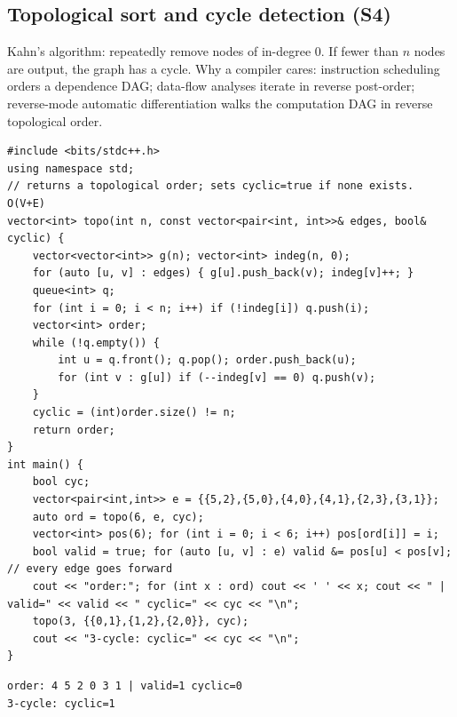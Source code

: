 \documentclass[10pt,a4paper,openany,oneside]{report}
\begin{document}
\subsection{Topological sort and cycle detection (S4)}
\begin{srcbox}
Kahn's algorithm: repeatedly remove nodes of in-degree 0. If fewer than $n$ nodes are output, the graph has a cycle. Why a compiler cares: instruction scheduling orders a dependence DAG; data-flow analyses iterate in reverse post-order; reverse-mode automatic differentiation walks the computation DAG in reverse topological order.
\end{srcbox}
\begin{lstlisting}[language={[11]C++}]
#include <bits/stdc++.h>
using namespace std;
// returns a topological order; sets cyclic=true if none exists. O(V+E)
vector<int> topo(int n, const vector<pair<int, int>>& edges, bool& cyclic) {
    vector<vector<int>> g(n); vector<int> indeg(n, 0);
    for (auto [u, v] : edges) { g[u].push_back(v); indeg[v]++; }
    queue<int> q;
    for (int i = 0; i < n; i++) if (!indeg[i]) q.push(i);
    vector<int> order;
    while (!q.empty()) {
        int u = q.front(); q.pop(); order.push_back(u);
        for (int v : g[u]) if (--indeg[v] == 0) q.push(v);
    }
    cyclic = (int)order.size() != n;
    return order;
}
int main() {
    bool cyc;
    vector<pair<int,int>> e = {{5,2},{5,0},{4,0},{4,1},{2,3},{3,1}};
    auto ord = topo(6, e, cyc);
    vector<int> pos(6); for (int i = 0; i < 6; i++) pos[ord[i]] = i;
    bool valid = true; for (auto [u, v] : e) valid &= pos[u] < pos[v];     // every edge goes forward
    cout << "order:"; for (int x : ord) cout << ' ' << x; cout << " | valid=" << valid << " cyclic=" << cyc << "\n";
    topo(3, {{0,1},{1,2},{2,0}}, cyc);
    cout << "3-cycle: cyclic=" << cyc << "\n";
}
\end{lstlisting}
\begin{lstlisting}[style=out,title={Answer: captured output}]
order: 4 5 2 0 3 1 | valid=1 cyclic=0
3-cycle: cyclic=1
\end{lstlisting}
\end{document}
